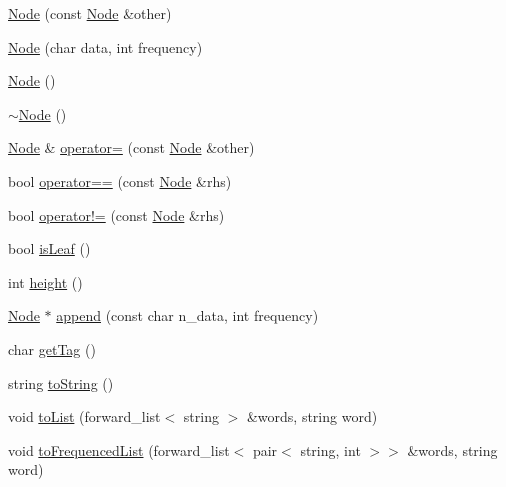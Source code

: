 \begin{DoxyCompactItemize}
\item 
\hyperlink{class_node_a95419c19d47e2521d437b81768c3896e}{Node} (const \hyperlink{class_node}{Node} \&other)
\item 
\hyperlink{class_node_a42c85c1e6abbc2999f85cf19dd8bc7c2}{Node} (char data, int frequency)
\item 
\hyperlink{class_node_a0ac1d44cfe588be564acf25485029bd8}{Node} ()
\item 
\hyperlink{class_node_ae923d0417581dd19784d55b901f0f7f0}{$\sim$\-Node} ()
\item 
\hyperlink{class_node}{Node} \& \hyperlink{class_node_aeacd56499cfe37836344a2eb679490f4}{operator=} (const \hyperlink{class_node}{Node} \&other)
\item 
bool \hyperlink{class_node_adcebaf614477737c439128517415f799}{operator==} (const \hyperlink{class_node}{Node} \&rhs)
\item 
bool \hyperlink{class_node_a9ae22944b815b5f95bc5f31f9f6b41ab}{operator!=} (const \hyperlink{class_node}{Node} \&rhs)
\item 
bool \hyperlink{class_node_a26f91ff0b0d5ea8940c7fde220aca742}{is\-Leaf} ()
\item 
int \hyperlink{class_node_a0da7f6a2356d1e7f047f8bfda1edd8d8}{height} ()
\item 
\hyperlink{class_node}{Node} $\ast$ \hyperlink{class_node_ac175219981b8633f47f6a93f6271cd91}{append} (const char n\-\_\-data, int frequency)
\item 
char \hyperlink{class_node_affb5abc8a7422a40c44deba0a79a10cf}{get\-Tag} ()
\item 
string \hyperlink{class_node_abb91d745a01f97fe51a35811e0d42801}{to\-String} ()
\item 
void \hyperlink{class_node_acca1581b1ffc18b14ac92073d932c099}{to\-List} (forward\-\_\-list$<$ string $>$ \&words, string word)
\item 
void \hyperlink{class_node_ae8592b9ab27d013cf6acc6efacb39d1a}{to\-Frequenced\-List} (forward\-\_\-list$<$ pair$<$ string, int $>$$>$ \&words, string word)
\end{DoxyCompactItemize}
